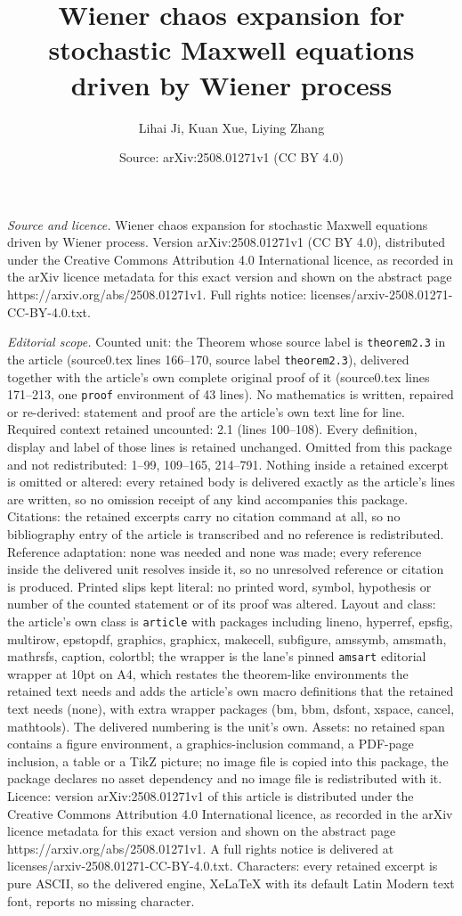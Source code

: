\documentclass[10pt,a4paper]{amsart}
\title[Wiener chaos expansion for stochastic Maxwell equations driv]{Wiener chaos expansion for stochastic Maxwell equations driven by Wiener process}
\author{Lihai Ji, Kuan Xue, Liying Zhang}
\date{Source: arXiv:2508.01271v1 (CC BY 4.0)}
\begin{document}
\maketitle

\noindent\emph{Source and licence.} Wiener chaos expansion for stochastic Maxwell equations driven by Wiener process. Version arXiv:2508.01271v1 (CC BY 4.0), distributed under the Creative Commons Attribution 4.0 International licence, as recorded in the arXiv licence metadata for this exact version and shown on the abstract page https://arxiv.org/abs/2508.01271v1. Full rights notice: licenses/arxiv-2508.01271-CC-BY-4.0.txt.\par\smallskip

\noindent\textit{Editorial scope.} Counted unit: the Theorem whose source label is \texttt{theorem2.3} in the article (source0.tex lines 166--170, source label \texttt{theorem2.3}), delivered together with the article's own complete original proof of it (source0.tex lines 171--213, one \texttt{proof} environment of 43 lines). No mathematics is written, repaired or re-derived: statement and proof are the article's own text line for line. Required context retained uncounted: 2.1 (lines 100--108). Every definition, display and label of those lines is retained unchanged. Omitted from this package and not redistributed: 1--99, 109--165, 214--791. Nothing inside a retained excerpt is omitted or altered: every retained body is delivered exactly as the article's lines are written, so no omission receipt of any kind accompanies this package. Citations: the retained excerpts carry no citation command at all, so no bibliography entry of the article is transcribed and no reference is redistributed. Reference adaptation: none was needed and none was made; every reference inside the delivered unit resolves inside it, so no unresolved reference or citation is produced. Printed slips kept literal: no printed word, symbol, hypothesis or number of the counted statement or of its proof was altered. Layout and class: the article's own class is \texttt{article} with packages including lineno, hyperref, epsfig, multirow, epstopdf, graphics, graphicx, makecell, subfigure, amssymb, amsmath, mathrsfs, caption, colortbl; the wrapper is the lane's pinned \texttt{amsart} editorial wrapper at 10pt on A4, which restates the theorem-like environments the retained text needs and adds the article's own macro definitions that the retained text needs (none), with extra wrapper packages (bm, bbm, dsfont, xspace, cancel, mathtools). The delivered numbering is the unit's own. Assets: no retained span contains a figure environment, a graphics-inclusion command, a PDF-page inclusion, a table or a TikZ picture; no image file is copied into this package, the package declares no asset dependency and no image file is redistributed with it. Licence: version arXiv:2508.01271v1 of this article is distributed under the Creative Commons Attribution 4.0 International licence, as recorded in the arXiv licence metadata for this exact version and shown on the abstract page https://arxiv.org/abs/2508.01271v1. A full rights notice is delivered at licenses/arxiv-2508.01271-CC-BY-4.0.txt. Characters: every retained excerpt is pure ASCII, so the delivered engine, XeLaTeX with its default Latin Modern text font, reports no missing character.
\end{document}

